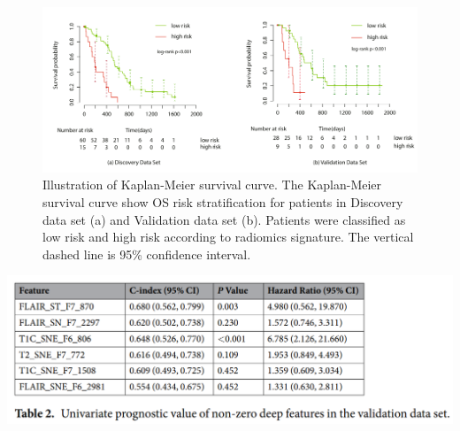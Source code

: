 \documentclass[
]{beamer}
\begin{document}
	\begin{frame}
		\begin{figure}
			\includegraphics[scale=0.45]{km1}
			\caption{Illustration of Kaplan-Meier survival curve. The Kaplan-Meier survival curve show OS risk
				stratification for patients in Discovery data set (a) and Validation data set (b). Patients were classified as low risk
				and high risk according to radiomics signature. The vertical dashed line is 95\% confidence interval.}
		\end{figure}
	\end{frame}
	
	\begin{frame}
	\includegraphics[scale=0.4]{res22}
\end{frame}
	
\end{document}
